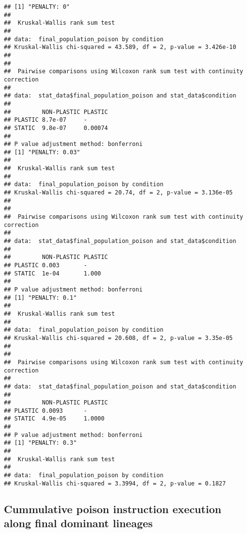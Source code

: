 \documentclass[]{book}
\begin{document}
\begin{verbatim}
## [1] "PENALTY: 0"
## 
##  Kruskal-Wallis rank sum test
## 
## data:  final_population_poison by condition
## Kruskal-Wallis chi-squared = 43.589, df = 2, p-value = 3.426e-10
## 
## 
##  Pairwise comparisons using Wilcoxon rank sum test with continuity correction 
## 
## data:  stat_data$final_population_poison and stat_data$condition 
## 
##         NON-PLASTIC PLASTIC
## PLASTIC 8.7e-07     -      
## STATIC  9.8e-07     0.00074
## 
## P value adjustment method: bonferroni 
## [1] "PENALTY: 0.03"
## 
##  Kruskal-Wallis rank sum test
## 
## data:  final_population_poison by condition
## Kruskal-Wallis chi-squared = 20.74, df = 2, p-value = 3.136e-05
## 
## 
##  Pairwise comparisons using Wilcoxon rank sum test with continuity correction 
## 
## data:  stat_data$final_population_poison and stat_data$condition 
## 
##         NON-PLASTIC PLASTIC
## PLASTIC 0.003       -      
## STATIC  1e-04       1.000  
## 
## P value adjustment method: bonferroni 
## [1] "PENALTY: 0.1"
## 
##  Kruskal-Wallis rank sum test
## 
## data:  final_population_poison by condition
## Kruskal-Wallis chi-squared = 20.608, df = 2, p-value = 3.35e-05
## 
## 
##  Pairwise comparisons using Wilcoxon rank sum test with continuity correction 
## 
## data:  stat_data$final_population_poison and stat_data$condition 
## 
##         NON-PLASTIC PLASTIC
## PLASTIC 0.0093      -      
## STATIC  4.9e-05     1.0000 
## 
## P value adjustment method: bonferroni 
## [1] "PENALTY: 0.3"
## 
##  Kruskal-Wallis rank sum test
## 
## data:  final_population_poison by condition
## Kruskal-Wallis chi-squared = 3.3994, df = 2, p-value = 0.1827
\end{verbatim}

\hypertarget{cummulative-poison-instruction-execution-along-final-dominant-lineages}{%
\subsection{Cummulative poison instruction execution along final dominant lineages}\label{cummulative-poison-instruction-execution-along-final-dominant-lineages}}
\end{document}

